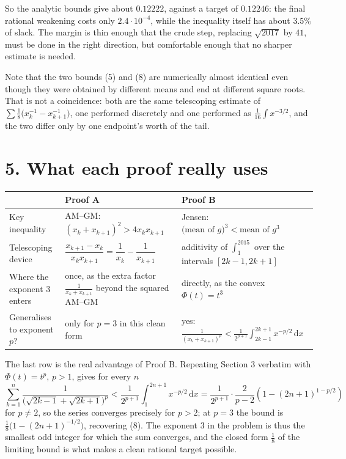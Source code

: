 \documentclass[12pt]{article}
\newcommand{\dd}{\,\mathrm{d}}
\newcommand{\xk}{x_k}
\newcommand{\xkp}{x_{k+1}}
\begin{document}
So the analytic bounds give about \(0.12222\), against a target of
\(0.12246\): the final rational weakening costs only \(2.4\cdot10^{-4}\),
while the inequality itself has about \(3.5\%\) of slack. The margin is
thin enough that the crude step, replacing \(\sqrt{2017}\) by \(41\),
must be done in the right direction, but comfortable enough that no
sharper estimate is needed.

Note that the two bounds (5) and (8) are numerically almost identical
even though they were obtained by different means and end at different
square roots. That is not a coincidence: both are the same telescoping
estimate of \(\sum\frac18\bigl(x_k^{-1}-x_{k+1}^{-1}\bigr)\), one
performed discretely and one performed as \(\frac1{16}\int x^{-3/2}\),
and the two differ only by one endpoint's worth of the tail.

\section*{5. What each proof really uses}

\begin{center}
\small
\renewcommand{\arraystretch}{1.45}
\begin{tabularx}{\textwidth}{@{}>{\raggedright\arraybackslash}p{}XX@{}}
\toprule
& Proof A & Proof B \\
\midrule
Key inequality
& AM--GM: \((\xk+\xkp)^2>4\xk\xkp\)
& Jensen: \(\bigl(\text{mean of }g\bigr)^3<\text{mean of }g^3\) \\
\addlinespace
Telescoping device
& \(\dfrac{\xkp-\xk}{\xk\xkp}=\dfrac1{\xk}-\dfrac1{\xkp}\)
& additivity of \(\displaystyle\int_1^{2015}\) over the intervals \([2k-1,2k+1]\) \\
\addlinespace
Where the exponent \(3\) enters
& once, as the extra factor \(\frac1{\xk+\xkp}\) beyond the squared AM--GM
& directly, as the convex \(\Phi(t)=t^3\) \\
\addlinespace
Generalises to exponent \(p\)?
& only for \(p=3\) in this clean form
& yes: \(\frac1{(\xk+\xkp)^p}<\frac1{2^{p+1}}\displaystyle\int_{2k-1}^{2k+1}x^{-p/2}\dd x\) \\
\bottomrule
\end{tabularx}
\end{center}

The last row is the real advantage of Proof B. Repeating Section 3
verbatim with \(\Phi(t)=t^p\), \(p>1\), gives for every \(n\)
\[
\sum_{k=1}^{n}\frac1{\bigl(\sqrt{2k-1}+\sqrt{2k+1}\bigr)^{p}}
<\frac1{2^{p+1}}\int_1^{2n+1}x^{-p/2}\dd x
=\frac1{2^{p+1}}\cdot\frac{2}{p-2}\left(1-(2n+1)^{1-p/2}\right)
\]
for \(p\ne2\), so the series converges precisely for \(p>2\); at
\(p=3\) the bound is \(\frac18\bigl(1-(2n+1)^{-1/2}\bigr)\), recovering
(8). The exponent \(3\) in the problem is thus the smallest odd integer
for which the sum converges, and the closed form \(\frac18\) of the
limiting bound is what makes a clean rational target possible.
\end{document}
